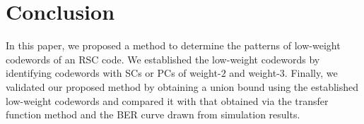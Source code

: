 \section{Conclusion}
\label{sec6}
In this paper, we proposed a method to determine the patterns of low-weight codewords of an RSC code. We established the low-weight codewords by identifying codewords with SCs or PCs of weight-$2$ and weight-$3$. Finally, we validated our proposed method by obtaining a union bound using the established low-weight codewords and compared it with that obtained via the transfer function method and the BER curve drawn from simulation results.
